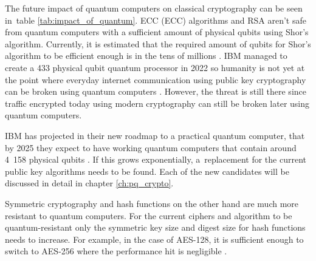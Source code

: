 The future impact of quantum computers on classical cryptography can be seen in~table \ref{tab:impact_of_quantum}. ECC (\acl{ECC}) algorithms and RSA aren't safe from quantum computers with a sufficient amount of physical qubits using Shor's algorithm. Currently, it is estimated that the required amount of qubits for Shor's algorithm to be efficient enough is in the tens of millions \cite{Bernstein149}\cite{Mosca2015}. IBM managed to create a 433 physical qubit quantum processor in 2022 so humanity is not yet at the point where everyday internet communication using public key cryptography can be broken using quantum computers \cite{0MBNdFRCTLK35MFY}. However, the threat is still there since traffic encrypted today using modern cryptography can still be broken later using quantum computers.

IBM has projected in their new roadmap to a practical quantum computer, that by 2025 they expect to have working quantum computers that contain around 4~158 physical qubits \cite{Gambetta2021}. If this grows exponentially, a~replacement for the current public key algorithms needs to be found. Each of the new candidates will be discussed in detail in chapter \ref{ch:pq_crypto}.

Symmetric cryptography and hash functions on the other hand are much more resistant to quantum computers. For the current ciphers and algorithm to be quantum-resistant only the symmetric key size and digest size for hash functions needs to increase. For example, in the case of AES-128, it is sufficient enough to switch to AES-256 where the performance hit is negligible \cite{Bernstein149}.

